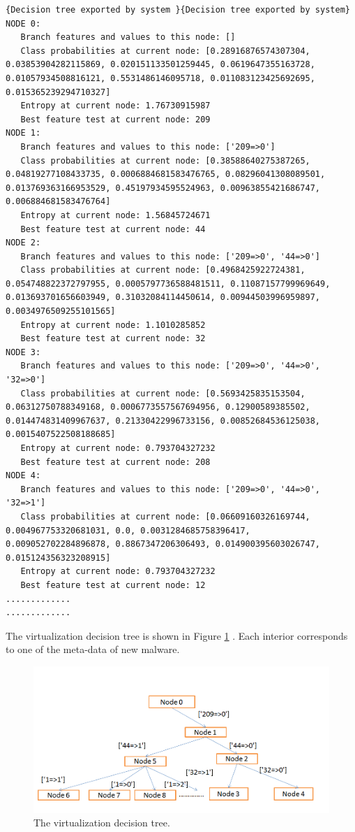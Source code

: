 \begin{lstlisting}{Decision tree exported by system }{Decision tree exported by system}
NODE 0:
   Branch features and values to this node: []
   Class probabilities at current node: [0.28916876574307304, 0.03853904282115869, 0.020151133501259445, 0.0619647355163728, 0.01057934508816121, 0.5531486146095718, 0.011083123425692695, 0.015365239294710327]
   Entropy at current node: 1.76730915987
   Best feature test at current node: 209
NODE 1:
   Branch features and values to this node: ['209=>0']
   Class probabilities at current node: [0.38588640275387265, 0.04819277108433735, 0.0006884681583476765, 0.08296041308089501, 0.013769363166953529, 0.45197934595524963, 0.00963855421686747, 0.006884681583476764]
   Entropy at current node: 1.56845724671
   Best feature test at current node: 44
NODE 2:
   Branch features and values to this node: ['209=>0', '44=>0']
   Class probabilities at current node: [0.4968425922724381, 0.054748822372797955, 0.0005797736588481511, 0.11087157799969649, 0.013693701656603949, 0.31032084114450614, 0.00944503996959897, 0.0034976509255101565]
   Entropy at current node: 1.1010285852
   Best feature test at current node: 32
NODE 3:
   Branch features and values to this node: ['209=>0', '44=>0', '32=>0']
   Class probabilities at current node: [0.5693425835153504, 0.06312750788349168, 0.0006773557567694956, 0.12900589385502, 0.014474831409967637, 0.21330422996733156, 0.00852684536125038, 0.0015407522508188685]
   Entropy at current node: 0.793704327232
   Best feature test at current node: 208
NODE 4:
   Branch features and values to this node: ['209=>0', '44=>0', '32=>1']
   Class probabilities at current node: [0.06609160326169744, 0.004967753320681031, 0.0, 0.0031284685758396417, 0.009052702284896878, 0.8867347206306493, 0.014900395603026747, 0.015124356323208915]
   Entropy at current node: 0.793704327232
   Best feature test at current node: 12
.............
.............
\end{lstlisting}
The virtualization decision tree is shown in Figure    \ref{fig:classificationsystem} . Each interior corresponds to one of the meta-data of new malware.
\begin{figure}[h!]
\centering
\includegraphics[width=1\textwidth]{graph/classificationsystem.png}
\caption{The virtualization decision tree.}
\label{fig:classificationsystem}
\end{figure}